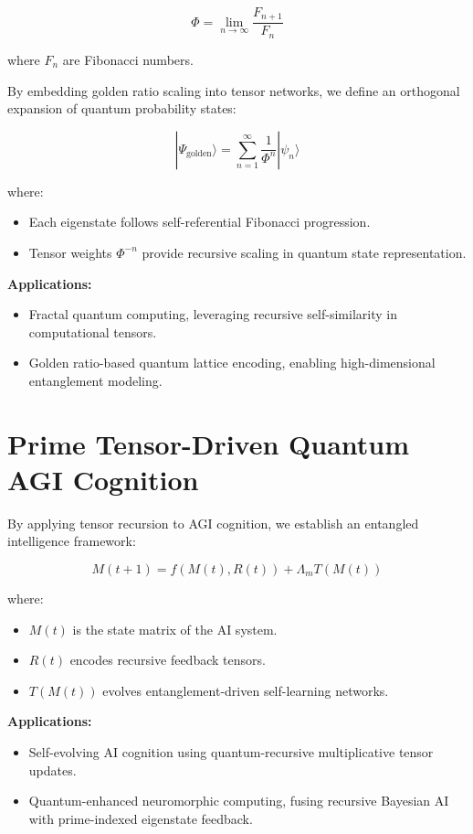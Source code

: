 \documentclass{article}
\theoremstyle{plain}
\begin{document}
\begin{equation}
\Phi = \lim_{n\to\infty} \frac{F_{n+1}}{F_n}
\end{equation}

where \( F_n \) are Fibonacci numbers.

By embedding golden ratio scaling into tensor networks, we define an orthogonal expansion of quantum probability states:

\begin{equation}
|\Psi_{\text{golden}}\rangle = \sum_{n=1}^{\infty} \frac{1}{\Phi^n} |\psi_n\rangle
\end{equation}

where:
\begin{itemize}
    \item Each eigenstate follows self-referential Fibonacci progression.
    \item Tensor weights \( \Phi^{-n} \) provide recursive scaling in quantum state representation.
\end{itemize}

\textbf{Applications:}
\begin{itemize}
    \item Fractal quantum computing, leveraging recursive self-similarity in computational tensors.
    \item Golden ratio-based quantum lattice encoding, enabling high-dimensional entanglement modeling.
\end{itemize}

\section{Prime Tensor-Driven Quantum AGI Cognition}
By applying tensor recursion to AGI cognition, we establish an entangled intelligence framework:

\begin{equation}
M(t+1) = f(M(t), R(t)) + \Lambda_m T(M(t))
\end{equation}

where:
\begin{itemize}
    \item \( M(t) \) is the state matrix of the AI system.
    \item \( R(t) \) encodes recursive feedback tensors.
    \item \( T(M(t)) \) evolves entanglement-driven self-learning networks.
\end{itemize}

\textbf{Applications:}
\begin{itemize}
    \item Self-evolving AI cognition using quantum-recursive multiplicative tensor updates.
    \item Quantum-enhanced neuromorphic computing, fusing recursive Bayesian AI with prime-indexed eigenstate feedback.
\end{itemize}
\end{document}
